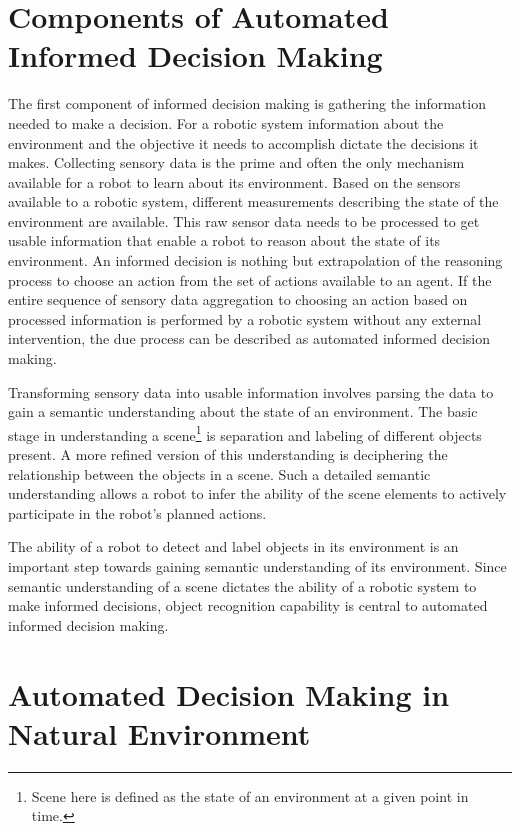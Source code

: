 \documentclass {udthesis}
\begin{document}
\section{Components of Automated Informed Decision Making}

The first component of informed decision making is gathering the information needed to make a decision. 
For a robotic system
information about the environment and the objective it needs to accomplish dictate the decisions it makes. 
Collecting sensory data is the prime 
and often the only mechanism available for a robot to learn about its environment. Based on the sensors available to a 
robotic system, different measurements describing the state of the environment are available. This raw sensor data needs to be processed to get usable information that enable a robot to reason about the state of its environment. 
An informed decision is 
nothing but extrapolation of the reasoning process to choose an action from the set of actions available to an agent.
If the entire sequence of sensory data aggregation to choosing an action based on processed information is performed by
a robotic system without any external intervention, the due process can be described as automated informed decision making. 

Transforming sensory data into usable information involves parsing the data to gain a semantic understanding about the state of an environment.
The basic stage in understanding a scene\footnote{Scene here is defined as the state of an environment at a given point in time.} is separation and labeling of different objects present.
A more refined version of this understanding is deciphering the relationship between the objects in a scene.
Such a detailed semantic understanding allows a robot to infer the ability of the scene elements 
to actively participate in the robot's planned actions.

The ability of a robot to detect and label objects in its environment is an important step towards gaining semantic understanding of its environment.
Since semantic understanding of a scene dictates the ability of a robotic system to make informed decisions, object recognition capability
is central to automated informed decision making.

\section{Automated Decision Making in Natural Environment}
\end{document}
